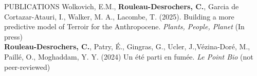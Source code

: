 \documentclass[
	11pt, %
]{resume} %
\begin{document}
\begin{rSection}{PUBLICATIONS}
Wolkovich, E.M., \textbf{Rouleau-Desrochers, C.}, Garcia de Cortazar-Atauri, I., Walker, M. A., Lacombe, T. (2025). Building a more predictive model of Terroir for the Anthropocene. \textit{Plants, People, Planet} (In press)
	\vspace{1.5ex}\\
\textbf{Rouleau-Desrochers, C.}, Patry, É., Gingras, G., Ucler, J.,Vézina-Doré, M., Paillé, O., Moghaddam, Y. Y. (2024) Un été parti en fumée. \textit{Le Point Bio} (not peer-reviewed)
\end{rSection}
\end{document}
